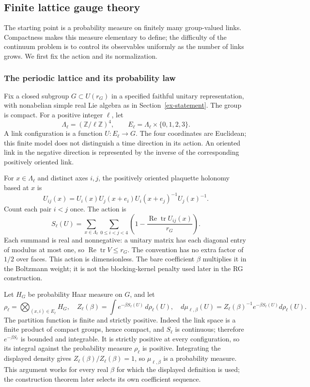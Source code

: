 \subsection{Finite lattice gauge theory}
\label{sec:ex-lattice}
\label{ex-lattice}

The starting point is a probability measure on finitely many group-valued links.
Compactness makes this measure elementary to define; the difficulty of the
continuum problem is to control its observables uniformly as the number of links
grows. We first fix the action and its normalization.

\subsubsection{The periodic lattice and its probability law}
\label{subsec:ex-lattice-finite}

Fix a closed subgroup $G\subset U(r_G)$ in a specified faithful unitary
representation, with nonabelian simple real Lie algebra as in
Section~\ref{ex-statement}. The group is compact. For a positive
integer $\ell$, let
\[
  \Lambda_\ell=(\mathbb Z/\ell\mathbb Z)^4,\qquad
  E_\ell=\Lambda_\ell\times\{0,1,2,3\}.
\]
A link configuration is a function $U:E_\ell\to G$. The four coordinates are
Euclidean; this finite model does not distinguish a time direction in its
action. An oriented link in the negative direction is represented by the
inverse of the corresponding positively oriented link.

For $x\in\Lambda_\ell$ and distinct axes $i,j$, the positively oriented
plaquette holonomy based at $x$ is
\[
 U_{ij}(x)=U_i(x)U_j(x+e_i)U_i(x+e_j)^{-1}U_j(x)^{-1}.
\]
Count each pair $i<j$ once. The action is
\[
 S_\ell(U)=\sum_{x\in\Lambda_\ell}\sum_{0\leq i<j<4}
   \left(1-\frac{\operatorname{Re}\operatorname{tr}U_{ij}(x)}{r_G}\right).
 \label{eq:ex-lattice-action}
\]
Each summand is real and nonnegative: a unitary matrix has each diagonal
entry of modulus at most one, so $\operatorname{Re}\operatorname{tr}V\leq r_G$.
The convention has no extra factor of $1/2$ over faces. This action is
dimensionless. The bare
coefficient $\beta$ multiplies it in the Boltzmann weight; it is not the
blocking-kernel penalty used later in the RG construction.

Let $H_G$ be probability Haar measure on $G$, and let
\[
 \rho_\ell=\bigotimes_{(x,i)\in E_\ell}H_G,
 \quad Z_\ell(\beta)=\int e^{-\beta S_\ell(U)}\,d\rho_\ell(U),
 \quad d\mu_{\ell,\beta}(U)=Z_\ell(\beta)^{-1}e^{-\beta S_\ell(U)}d\rho_\ell(U).
\]
The partition function is finite and strictly positive. Indeed the link space
is a finite product of compact groups, hence compact, and $S_\ell$ is continuous;
therefore $e^{-\beta S_\ell}$ is bounded and integrable. It is strictly
positive at every configuration, so its integral against the probability
measure $\rho_\ell$ is positive. Integrating the displayed density gives
$Z_\ell(\beta)/Z_\ell(\beta)=1$, so $\mu_{\ell,\beta}$ is a probability
measure. This argument works for every real $\beta$ for which the displayed
definition is used; the construction theorem later selects its own coefficient
sequence.

